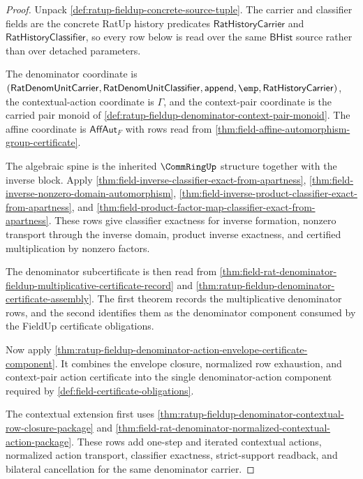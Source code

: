 \begin{proof}
Unpack \autoref{def:ratup-fieldup-concrete-source-tuple}. The carrier and
classifier fields are the concrete RatUp history predicates
$\mathsf{RatHistoryCarrier}$ and $\mathsf{RatHistoryClassifier}$, so every row
below is read over the same $\mathsf{BHist}$ source rather than over detached
parameters.

The denominator coordinate is
$(\mathsf{RatDenomUnitCarrier},\mathsf{RatDenomUnitClassifier},
\mathsf{append},\emp,\mathsf{RatHistoryCarrier})$, the contextual-action
coordinate is $\Gamma$, and the context-pair coordinate is the carried pair
monoid of \autoref{def:ratup-fieldup-denominator-context-pair-monoid}. The
affine coordinate is $\mathsf{AffAut}_F$ with rows read from
\autoref{thm:field-affine-automorphism-group-certificate}.

The algebraic spine is the inherited $\CommRingUp$ structure together with the
inverse block. Apply
\autoref{thm:field-inverse-classifier-exact-from-apartness},
\autoref{thm:field-inverse-nonzero-domain-automorphism},
\autoref{thm:field-inverse-product-classifier-exact-from-apartness}, and
\autoref{thm:field-product-factor-map-classifier-exact-from-apartness}. These
rows give classifier exactness for inverse formation, nonzero transport through
the inverse domain, product inverse exactness, and certified multiplication by
nonzero factors.

The denominator subcertificate is then read from
\autoref{thm:field-rat-denominator-fieldup-multiplicative-certificate-record}
and \autoref{thm:ratup-fieldup-denominator-certificate-assembly}. The first
theorem records the multiplicative denominator rows, and the second identifies
them as the denominator component consumed by the FieldUp certificate
obligations.

Now apply
\autoref{thm:ratup-fieldup-denominator-action-envelope-certificate-component}.
It combines the envelope closure, normalized row exhaustion, and context-pair
action certificate into the single denominator-action component required by
\autoref{def:field-certificate-obligations}.

The contextual extension first uses
\autoref{thm:ratup-fieldup-denominator-contextual-row-closure-package} and
\autoref{thm:field-rat-denominator-normalized-contextual-action-package}. These
rows add one-step and iterated contextual actions, normalized action transport,
classifier exactness, strict-support readback, and bilateral cancellation for
the same denominator carrier.


\end{proof}
